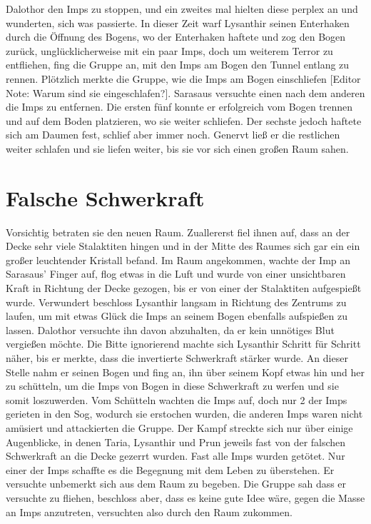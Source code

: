\documentclass[10pt,twoside,twocolumn,openany]{book}
\begin{document}
Dalothor den Imps zu stoppen, und ein zweites mal hielten diese perplex an und wunderten, sich was passierte. In dieser Zeit warf Lysanthir seinen Enterhaken durch die Öffnung des Bogens, wo der Enterhaken haftete und zog den Bogen zurück, unglücklicherweise mit ein paar Imps, doch um weiterem Terror zu entfliehen, fing die Gruppe an, mit den Imps am Bogen den Tunnel entlang zu rennen. Plötzlich merkte die Gruppe, wie die Imps am Bogen einschliefen [Editor Note: Warum sind sie eingeschlafen?]. Sarasaus versuchte einen nach dem anderen die Imps zu entfernen. Die ersten fünf konnte er erfolgreich vom Bogen trennen und auf dem Boden platzieren, wo sie weiter schliefen. Der sechste jedoch haftete sich am Daumen fest, schlief aber immer noch. Genervt ließ er die restlichen weiter schlafen und sie liefen weiter, bis sie vor sich einen großen Raum sahen.
	
	\section{Falsche Schwerkraft}
	
	Vorsichtig betraten sie den neuen Raum. Zuallererst fiel ihnen auf, dass an der Decke sehr viele Stalaktiten hingen und in der Mitte des Raumes sich gar ein ein großer leuchtender Kristall befand. Im Raum angekommen, wachte der Imp an Sarasaus' Finger auf, flog etwas in die Luft und wurde von einer unsichtbaren Kraft in Richtung der Decke gezogen, bis er von einer der Stalaktiten aufgespießt wurde. Verwundert beschloss Lysanthir langsam in Richtung des Zentrums zu laufen, um mit etwas Glück die Imps an seinem Bogen ebenfalls aufspießen zu lassen. Dalothor versuchte ihn davon abzuhalten, da er kein unnötiges Blut vergießen möchte. Die Bitte ignorierend machte sich Lysanthir Schritt für Schritt näher, bis er merkte, dass die invertierte Schwerkraft stärker wurde. An dieser Stelle nahm er seinen Bogen und fing an, ihn über seinem Kopf etwas hin und her zu schütteln, um die Imps von Bogen in diese Schwerkraft zu werfen und sie somit loszuwerden. Vom Schütteln wachten die Imps auf, doch nur 2 der Imps gerieten in den Sog, wodurch sie erstochen wurden, die anderen Imps waren nicht amüsiert und attackierten die Gruppe. Der Kampf streckte sich nur über einige Augenblicke, in denen Taria, Lysanthir und Prun jeweils fast von der falschen Schwerkraft an die Decke gezerrt wurden. Fast alle Imps wurden getötet. Nur einer der Imps schaffte es die Begegnung mit dem Leben zu überstehen. Er versuchte unbemerkt sich aus dem Raum zu begeben. Die Gruppe sah dass er versuchte zu fliehen, beschloss aber, dass es keine gute Idee wäre, gegen die Masse an Imps anzutreten, versuchten also durch den Raum zukommen. 
	
\end{document}
